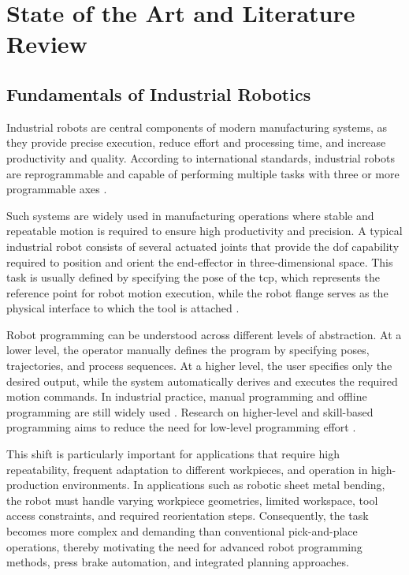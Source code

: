\chapter{State of the Art and Literature Review}
\label{ch:state-of-art}

\section{Fundamentals of Industrial Robotics}
\label{sec:fundamentals-industrial-robotics}
Industrial robots are central components of modern manufacturing systems, as they provide precise execution, reduce effort and processing time, and increase productivity and quality. According to international standards, industrial robots are reprogrammable and capable of performing multiple tasks with three or more programmable axes \cite{ISO8373}.

Such systems are widely used in manufacturing operations where stable and repeatable motion is required to ensure high productivity and precision. A typical industrial robot consists of several actuated joints that provide the \ac{dof} capability required to position and orient the end-effector in three-dimensional space. This task is usually defined by specifying the pose of the \ac{tcp}, which represents the reference point for robot motion execution, while the robot flange serves as the physical interface to which the tool is attached \cite{craig2005robotics}.

Robot programming can be understood across different levels of abstraction. At a lower level, the operator manually defines the program by specifying poses, trajectories, and process sequences. At a higher level, the user specifies only the desired output, while the system automatically derives and executes the required motion commands. In industrial practice, manual programming and offline programming are still widely used \cite{Pan2012Survey}. Research on higher-level and skill-based programming aims to reduce the need for low-level programming effort \cite{Kruger2019}.

This shift is particularly important for applications that require high repeatability, frequent adaptation to different workpieces, and operation in high-production environments. In applications such as robotic sheet metal bending, the robot must handle varying workpiece geometries, limited workspace, tool access constraints, and required reorientation steps. Consequently, the task becomes more complex and demanding than conventional pick-and-place operations, thereby motivating the need for advanced robot programming methods, press brake automation, and integrated planning approaches.

